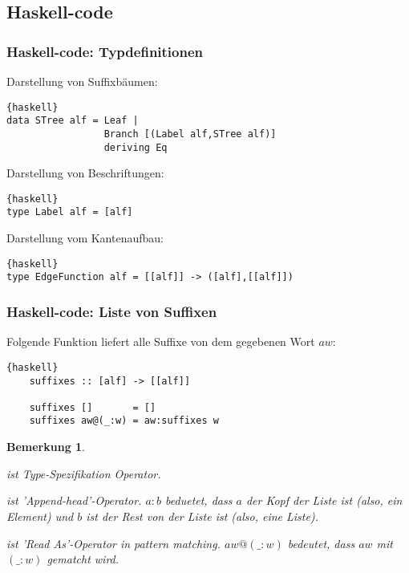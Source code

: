 \documentclass{beamer}
\newtheorem{remark}[theorem]{Bemerkung}
\begin{document}
\subsection{Haskell-code}

\begin{frame}[fragile]
\frametitle{Haskell-code: Typdefinitionen}
Darstellung von Suffixbäumen:
\begin{lstlisting}{haskell}
data STree alf = Leaf | 
                 Branch [(Label alf,STree alf)] 
                 deriving Eq
\end{lstlisting}
\bigskip
Darstellung von Beschriftungen:
\begin{lstlisting}{haskell}
type Label alf = [alf]
\end{lstlisting}
\bigskip
Darstellung vom Kantenaufbau:
\begin{lstlisting}{haskell}
type EdgeFunction alf = [[alf]] -> ([alf],[[alf]])
\end{lstlisting}
\end{frame}

\begin{frame}[fragile]
\frametitle{Haskell-code: Liste von Suffixen}
    Folgende Funktion liefert alle Suffixe von dem gegebenen Wort $aw$:
    \begin{lstlisting}{haskell}
    suffixes :: [alf] -> [[alf]]

    suffixes []       = []              
    suffixes aw@(_:w) = aw:suffixes w 
    \end{lstlisting}
    \bigskip
    \begin{remark}
    \begin{description}[l]
        \item[Operator $"::\:"$] ist Type-Spezifikation Operator.
        \item[Operator $":\:"$] ist 'Append-head'-Operator. $a:b$ beduetet, dass $a$ der Kopf der Liste ist (also, ein Element) und $b$ ist der Rest von der Liste ist (also, eine Liste). 
        \item[Operator $"@\:"$] ist 'Read As'-Operator in pattern matching. $aw@(\_:w)$ bedeutet, dass $aw$ mit $(\_:w)$ gematcht wird.  
    \end{description}       
    \end{remark}
\end{frame}
\end{document}
